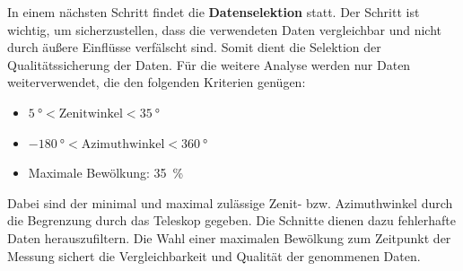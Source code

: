 In einem nächsten Schritt findet die \textbf{Datenselektion} statt. Der Schritt
ist wichtig, um sicherzustellen, dass die verwendeten Daten vergleichbar und
nicht durch äußere Einflüsse verfälscht sind. Somit dient die Selektion der
Qualitätssicherung der Daten. Für die weitere Analyse werden nur Daten
weiterverwendet, die den folgenden Kriterien genügen:
\begin{itemize}
  \item $\SI{5}{\degree}<\text{Zenitwinkel}<\SI{35}{\degree}$
  \item $\SI{-180}{\degree}<\text{Azimuthwinkel}<\SI{360}{\degree}$
  \item Maximale Bewölkung: \SI{35}{\percent}
\end{itemize}
Dabei sind der minimal und maximal zulässige Zenit- bzw. Azimuthwinkel durch die
Begrenzung durch das Teleskop gegeben. Die Schnitte dienen dazu fehlerhafte
Daten herauszufiltern. Die Wahl einer maximalen Bewölkung zum Zeitpunkt der
Messung sichert die Vergleichbarkeit und Qualität der genommenen Daten.

